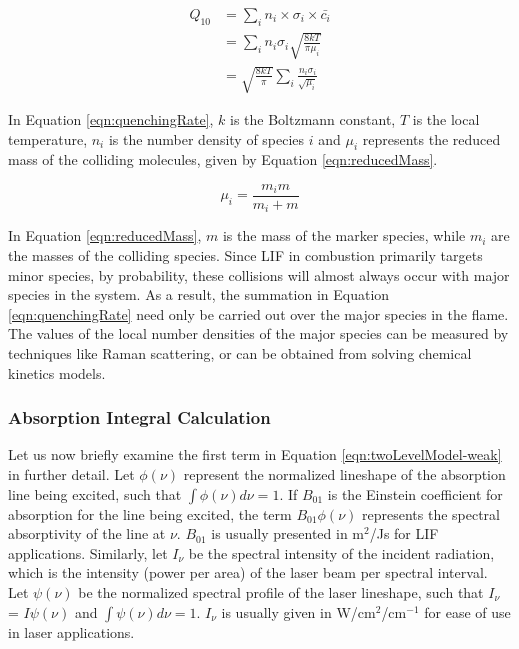 \begin{align}
  Q_{10} &= \sum_i n_i \times \sigma_i \times \bar{c_i} \nonumber \\
  & = \sum_i n_i \sigma_i \sqrt{\frac{8kT}{\pi\mu_i}} \nonumber \\
  & = \sqrt{\frac{8kT}{\pi}} \sum_i \frac{n_i \sigma_i}{\sqrt{\mu_i}}
  \label{eqn:quenchingRate}
\end{align}


In Equation \ref{eqn:quenchingRate}, \(k\) is the Boltzmann constant, \(T\) is the local temperature, \(n_i\) is the number density of species \(i\) and \(\mu_i\) represents the reduced mass of the colliding molecules, given by Equation \ref{eqn:reducedMass}.

\begin{equation}
  \mu_i = \frac{ m_i m }{ m_i + m }
  \label{eqn:reducedMass}
\end{equation}


In Equation \ref{eqn:reducedMass}, \(m\) is the mass of the marker species, while \(m_i\) are the masses of the colliding species.
Since LIF in combustion primarily targets minor species, by probability, these collisions will almost always occur with major species in the system.
As a result, the summation in Equation \ref{eqn:quenchingRate} need only be carried out over the major species in the flame.
The values of the local number densities of the major species can be measured by techniques like Raman scattering, or can be obtained from solving chemical kinetics models.

\subsubsection{Absorption Integral Calculation}
\label{subsubsec:basic-model-absorption-integral-calculation}

Let us now briefly examine the first term in Equation \ref{eqn:twoLevelModel-weak} in further detail.
Let \(\phi(\nu)\) represent the normalized lineshape of the absorption line being excited, such that \(\int \phi(\nu) d\nu = 1\).
If \(B_{01}\) is the Einstein coefficient for absorption for the line being excited, the term \(B_{01}\phi(\nu)\) represents the spectral absorptivity of the line at \(\nu\).
\(B_{01}\) is usually presented in m\(^2\)/Js for LIF applications.
Similarly, let \(I_\nu\) be the spectral intensity of the incident radiation, which is the intensity (power per area) of the laser beam per spectral interval.
Let \(\psi(\nu)\) be the normalized spectral profile of the laser lineshape, such that \(I_\nu\) = \(I \psi(\nu)\) and \(\int \psi(\nu) d\nu = 1\).
\(I_\nu\) is usually given in W/cm\(^2\)/cm\(^{-1}\) for ease of use in laser applications.

